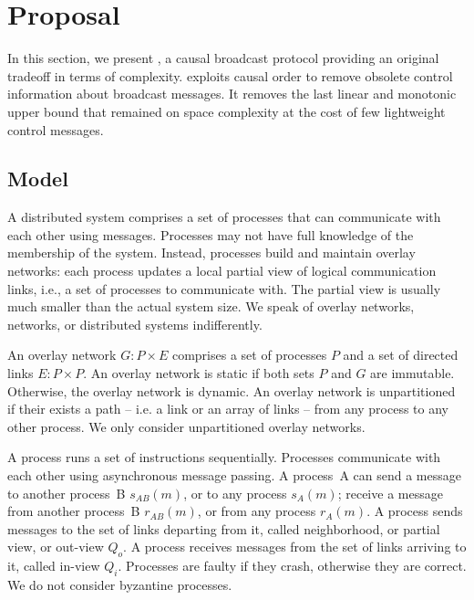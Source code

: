 
\section{Proposal}
\label{sec:proposal}

In this section, we present \RPCBROADCAST, a causal broadcast protocol providing
an original tradeoff in terms of complexity. \RPCBROADCAST exploits causal order
to remove obsolete control information about broadcast messages. It removes the
last linear and monotonic upper bound that remained on space complexity at the
cost of few lightweight control messages.

\subsection{Model}

A distributed system comprises a set of processes that can communicate with each
other using messages. Processes may not have full knowledge of the membership of
the system. Instead, processes build and maintain overlay networks: each process
updates a local partial view of logical communication links, i.e., a set of
processes to communicate with. The partial view is usually much smaller than the
actual system size. We speak of overlay networks, networks, or distributed
systems indifferently.

\begin{definition}
  An overlay network $G: P \times E$ comprises a set of processes $P$ and a set
  of directed links $E: P \times P$.  An overlay network is static if both sets
  $P$ and $G$ are immutable. Otherwise, the overlay network is dynamic. An
  overlay network is unpartitioned if their exists a path -- i.e. a link or an
  array of links -- from any process to any other process. We only consider
  unpartitioned overlay networks.
\end{definition}

\begin{definition}[Process]
  A process runs a set of instructions sequentially. Processes communicate with
  each other using asynchronous message passing. A process~A can send a message
  to another process~B $s_{AB}(m)$, or to any process $s_A(m)$; receive a
  message from another process~B $r_{AB}(m)$, or from any process $r_A(m)$. A
  process sends messages to the set of links departing from it, called
  neighborhood, or partial view, or out-view $Q_o$. A process receives messages
  from the set of links arriving to it, called in-view $Q_i$.  Processes are
  faulty if they crash, otherwise they are correct. We do not consider byzantine
  processes.
\end{definition}

